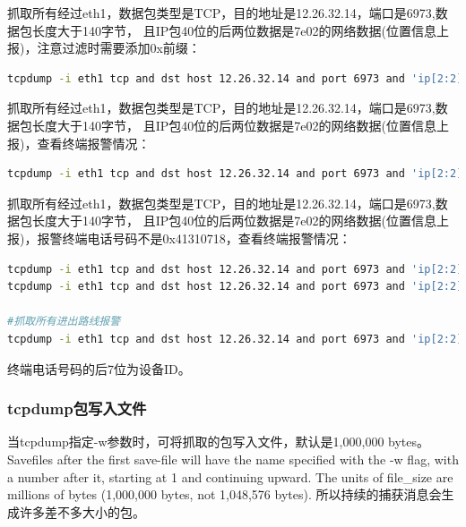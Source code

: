 \documentclass{book}
\begin{document}
抓取所有经过eth1，数据包类型是TCP，目的地址是12.26.32.14，端口是6973,数据包长度大于140字节，
且IP包40位的后两位数据是7e02的网络数据(位置信息上报)，注意过滤时需要添加0x前缀：

\begin{lstlisting}[language=Bash]
tcpdump -i eth1 tcp and dst host 12.26.32.14 and port 6973 and 'ip[2:2]>140 and ip[41:2]=0x7e02' -vv -X -c 100
\end{lstlisting}

抓取所有经过eth1，数据包类型是TCP，目的地址是12.26.32.14，端口是6973,数据包长度大于140字节，
且IP包40位的后两位数据是7e02的网络数据(位置信息上报)，查看终端报警情况：

\begin{lstlisting}[language=Bash]
tcpdump -i eth1 tcp and dst host 12.26.32.14 and port 6973 and 'ip[2:2]>0 and ip[41:2]=0x0200 and ip[53:4]!=0x00000000' -vv -X -c 100
\end{lstlisting}

抓取所有经过eth1，数据包类型是TCP，目的地址是12.26.32.14，端口是6973,数据包长度大于140字节，
且IP包40位的后两位数据是7e02的网络数据(位置信息上报)，报警终端电话号码不是0x41310718，查看终端报警情况：

\begin{lstlisting}[language=Bash]
tcpdump -i eth1 tcp and dst host 12.26.32.14 and port 6973 and 'ip[2:2]>0 and ip[41:2]=0x0200 and ip[53:4]!=0x00000000 and ip[46:4]!=0x41310718' -vv -X -c 100
tcpdump -i eth1 tcp and dst host 12.26.32.14 and port 6973 and 'ip[2:2]>100 and ip[41:2]=0x0200 and ip[53:4]==0x200000 and ip[46:4]!=0x41310718' -vv -X -c 10000

#抓取所有进出路线报警
tcpdump -i eth1 tcp and dst host 12.26.32.14 and port 6973 and 'ip[2:2]>0 and ip[41:2]=0x0200 and ip[53:4]==0x00100000' -vv -X -c 100
\end{lstlisting}

终端电话号码的后7位为设备ID。

\subsubsection{tcpdump包写入文件}

当tcpdump指定-w参数时，可将抓取的包写入文件，默认是1,000,000 bytes。
Savefiles after the first  save-file  will  have  the name specified with the -w flag, 
with a number after it, starting at 1 and continuing upward.  
The units of file\_size are millions of bytes (1,000,000 bytes, not 1,048,576 bytes).
所以持续的捕获消息会生成许多差不多大小的包。
\end{document}
